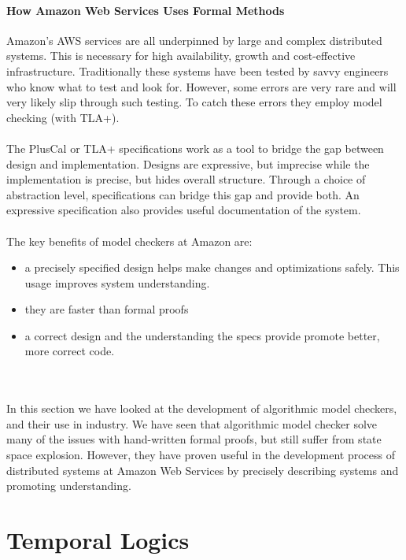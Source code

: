 \documentclass{uit-thesis}
\begin{document}
\paragraph{How Amazon Web Services Uses Formal Methods~\cite{Amazon2015}}
Amazon's AWS services are all underpinned by large and complex distributed systems. This is necessary for high availability, growth and cost-effective infrastructure. Traditionally these systems have been tested by savvy engineers who know what to test and look for. However, some errors are very rare and will very likely slip through such testing. To catch these errors they employ model checking (with TLA+).
\\\\
The PlusCal or TLA+ specifications work as a tool to bridge the gap between design and implementation. Designs are expressive, but imprecise while the implementation is precise, but hides overall structure. Through a choice of abstraction level, specifications can bridge this gap and provide both. An expressive specification also provides useful documentation of the system.
\\\\
The key benefits of model checkers at Amazon are:
\begin{itemize}
    \item a precisely specified design helps make changes and optimizations safely. This usage improves system understanding.
    \item they are faster than formal proofs
    \item a correct design and the understanding the specs provide promote better, more correct code.
\end{itemize}
\\\\
In this section we have looked at the development of algorithmic model checkers, and their use in industry. We have seen that algorithmic model checker solve many of the issues with hand-written formal proofs, but still suffer from state space explosion. However, they have proven useful in the development process of distributed systems at Amazon Web Services by precisely describing systems and promoting understanding.

\section{Temporal Logics}\label{sec:TL}
\end{document}
